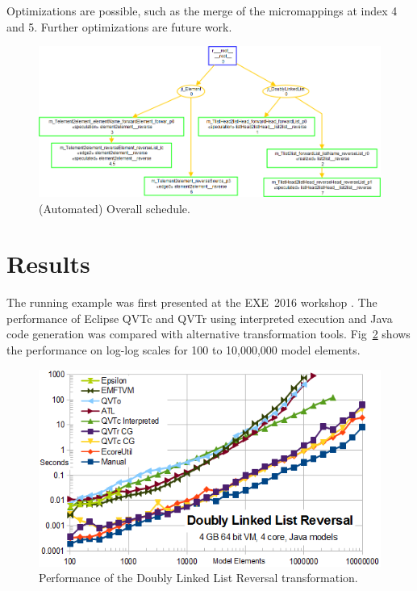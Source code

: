 \documentclass{llncs}
\begin{document}
Optimizations are possible, such as the merge of the micromappings at index 4 and 5. Further optimizations are future work.

\begin{figure}[h]
	\centering
	\includegraphics[width=1.0\textwidth]{QVTsSchedule.png}
	\caption{(Automated) Overall schedule.}
	\label{fig:QVTsSchedule}
\end{figure}

\section{Results}\label{Results}

The running example was first presented at the EXE~2016 workshop \cite{Willink-EXE2016}. The performance of Eclipse QVTc and QVTr using interpreted execution and Java code generation was compared with alternative transformation tools. Fig~\ref{fig:DoublyLinkedListReversalPerformance} shows the performance on log-log scales for 100 to 10,000,000 model elements.

\begin{figure}[h]
	\centering
	\includegraphics[width=1.0\textwidth]{DoublyLinkedListReversalPerformance.png}
	\caption{Performance of the Doubly Linked List Reversal transformation.}
	\label{fig:DoublyLinkedListReversalPerformance}
\end{figure}
\end{document}
